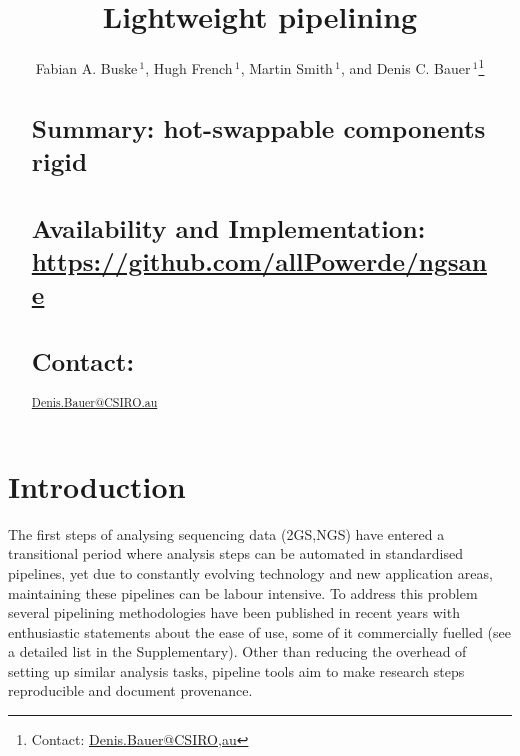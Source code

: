 \documentclass{bioinfo}
\begin{document}

\title[NGSANE]{Lightweight pipelining }
\author[Fabian A. Buske {\em et al.}]{Fabian A. Buske\,$^{1}$,
Hugh French\,$^{1}$,
Martin Smith\,$^{1}$,
and  Denis C. Bauer\,$^{1}$\footnote{Contact: \href{Denis.Bauer@CSIRO.au}{Denis.Bauer@CSIRO,au}}}
\address{
          $^{1}$Epigenetics Program, Cancer Research Division, Garvan Institute of Medical Research, Kinghorn Cancer Centre, Darlinghurst City, NSW 2010, Australia,\\
          $^{2}$Division of Computational Informatics, CSIRO, Sydney, NSW. 2113 Australia,\\
          }



\maketitle


\begin{abstract}
\section{Summary: hot-swappable components rigid }
\section{Availability and Implementation:   
 \url{https://github.com/allPowerde/ngsane}}
\section{Contact:} \href{Denis.Bauer@CSIRO.au}{Denis.Bauer@CSIRO.au}
\end{abstract}

\section{Introduction}

The first steps of analysing sequencing data (2GS,NGS) have entered a transitional period where analysis steps can be automated in standardised pipelines, yet due to constantly evolving technology and new application areas, maintaining these pipelines can be labour intensive. 
To address this problem several pipelining methodologies have been published in recent years with enthusiastic statements about the ease of use, some of it commercially fuelled (see a detailed list in the Supplementary). 
Other than reducing the overhead of setting up similar analysis tasks, pipeline tools aim to make research steps reproducible and document provenance. 
\end{document}
